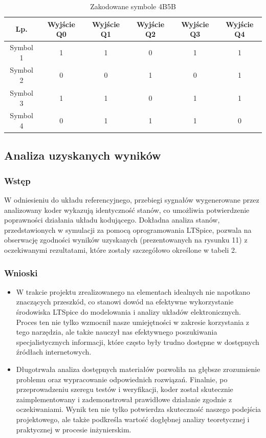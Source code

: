 \documentclass{article}
\begin{document}
\begin{table}[ht]
    \centering 
    \caption{Zakodowane symbole 4B5B}
    \vspace{20pt} 
    \label{tab:tabela} 
    \begin{tabular}{|c|c|c|c|c|c|} 
    \hline 
    \textbf{Lp.} & \textbf{Wyjście Q0} & \textbf{Wyjście Q1} & \textbf{Wyjście Q2} & \textbf{Wyjście Q3} & \textbf{Wyjście Q4} \\ \hline 
    Symbol 1 & 1 & 1 & 0 & 1 & 1 \\ \hline 
    Symbol 2 & 0 & 0 & 1 & 0 & 1 \\ \hline 
    Symbol 3 & 1 & 1 & 0 & 1 & 1 \\ \hline 
    Symbol 4 & 0 & 1 & 1 & 1 & 0 \\ \hline 
    \end{tabular}
\end{table}

\newpage

\subsection {Analiza uzyskanych wyników}
\subsubsection {Wstęp}
W odniesieniu do układu referencyjnego, przebiegi sygnałów wygenerowane przez analizowany koder wykazują identyczność stanów, co umożliwia potwierdzenie poprawności działania układu kodującego. Dokładna analiza stanów, przedstawionych w symulacji za pomocą oprogramowania LTSpice, pozwala na obserwację zgodności wyników uzyskanych (prezentowanych na rysunku 11) z oczekiwanymi rezultatami, które zostały szczegółowo określone w tabeli 2.
\subsubsection {Wnioski}
\begin{itemize}
\item W trakcie projektu zrealizowanego na elementach idealnych nie napotkano znaczących przeszkód, co stanowi dowód na efektywne wykorzystanie środowiska LTSpice do modelowania i analizy układów elektronicznych. Proces ten nie tylko wzmocnił nasze umiejętności w zakresie korzystania z tego narzędzia, ale także nauczył nas efektywnego poszukiwania specjalistycznych informacji, które często były trudno dostępne w dostępnych źródłach internetowych.
\item Długotrwała analiza dostępnych materiałów pozwoliła na głębsze zrozumienie problemu oraz wypracowanie odpowiednich rozwiązań. Finalnie, po przeprowadzeniu szeregu testów i weryfikacji, koder został skutecznie zaimplementowany i zademonstrował prawidłowe działanie zgodnie z oczekiwaniami. Wynik ten nie tylko potwierdza skuteczność naszego podejścia projektowego, ale także podkreśla wartość dogłębnej analizy teoretycznej i praktycznej w procesie inżynierskim.
\end{itemize}
\end{document}
